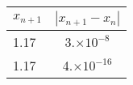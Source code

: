 \documentclass{article} %
\begin{document}
	
\begin{sideways}
	\begin{tabular}{lc}
		$x_{n+1}$ &$|x_{n+1}-x_n|$\\ \hline
		\cellcolor[gray]{0.80} 1.17 & 3.$\times10^{-8}$\\
		1.17 & 4.$\times10^{-16}$\\ \hline
	\end{tabular}
\end{sideways}
\end{document}
